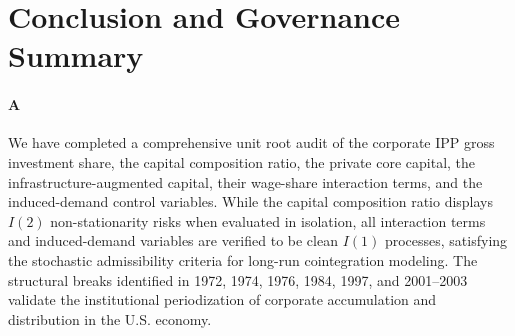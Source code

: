 \documentclass[11pt,a4paper]{article}
\begin{document}
\FloatBarrier
\section{Conclusion and Governance Summary}

\paragraph{A}
We have completed a comprehensive unit root audit of the corporate IPP gross investment share, the capital composition ratio, the private core capital, the infrastructure-augmented capital, their wage-share interaction terms, and the induced-demand control variables. While the capital composition ratio displays $I(2)$ non-stationarity risks when evaluated in isolation, all interaction terms and induced-demand variables are verified to be clean $I(1)$ processes, satisfying the stochastic admissibility criteria for long-run cointegration modeling. The structural breaks identified in 1972, 1974, 1976, 1984, 1997, and 2001--2003 validate the institutional periodization of corporate accumulation and distribution in the U.S. economy.
\end{document}
